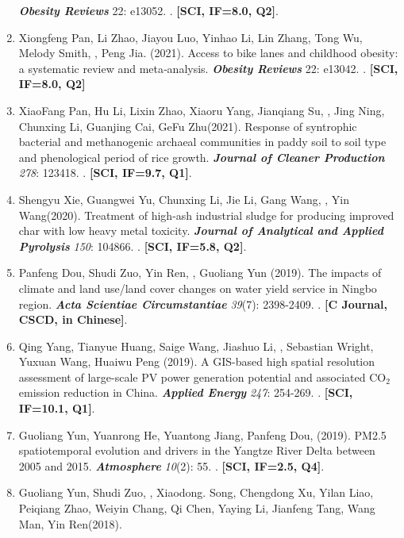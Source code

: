 \begin{enumerate}
    \textbf{\textit{Obesity Reviews}} 22: e13052.
    . \textbf{[SCI, IF=8.0, Q2]}.
\item
    Xiongfeng Pan, Li Zhao, Jiayou Luo, Yinhao Li, Lin Zhang, Tong Wu, Melody Smith, \Shaoqing, Peng Jia\CS. (2021).
    Access to bike lanes and childhood obesity: a systematic review and meta‐analysis.
    \textbf{\textit{Obesity Reviews}} 22: e13042.
    . \textbf{[SCI, IF=8.0, Q2]}
\item
    XiaoFang Pan, Hu Li, Lixin Zhao, Xiaoru Yang, Jianqiang Su, \Shaoqing, Jing Ning, Chunxing Li, Guanjing Cai, GeFu Zhu\CS (2021).
    Response of syntrophic bacterial and methanogenic archaeal communities in paddy soil to soil type and phenological period of rice growth.
    \textbf{\textit{Journal of Cleaner Production}} \textit{278}: 123418.
    . \textbf{[SCI, IF=9.7, Q1]}.
\item
    Shengyu Xie, Guangwei Yu\CS, Chunxing Li, Jie Li, Gang Wang, \Shaoqing, Yin Wang\CS (2020).
    Treatment of high-ash industrial sludge for producing improved char with low heavy metal toxicity.
    \textbf{\textit{Journal of Analytical and Applied Pyrolysis}} \textit{150}: 104866.
    . \textbf{[SCI, IF=5.8, Q2]}.
\item
    Panfeng Dou, Shudi Zuo\CS, Yin Ren, \Shaoqing, Guoliang Yun (2019).
    The impacts of climate and land use/land cover changes on water yield service in Ningbo region.
    \textbf{\textit{Acta Scientiae Circumstantiae}} \textit{39}(7): 2398-2409.
    . \textbf{[C Journal, CSCD, in Chinese]}.
\item
    Qing Yang\CS, Tianyue Huang, Saige Wang\CS, Jiashuo Li\CS, \Shaoqing, Sebastian Wright, Yuxuan Wang, Huaiwu Peng (2019).
    A GIS-based high spatial resolution assessment of large-scale PV power generation potential and associated CO$_2$ emission reduction in China.
    \textbf{\textit{Applied Energy}} \textit{247}: 254-269.
    . \textbf{[SCI, IF=10.1, Q1]}.
\item
    Guoliang Yun, Yuanrong He\CS, Yuantong Jiang, Panfeng Dou, \Shaoqing \enspace (2019).
    PM2.5 spatiotemporal evolution and drivers in the Yangtze River Delta between 2005 and 2015.
    \textbf{\textit{Atmosphere}} \textit{10}(2): 55.
    . \textbf{[SCI, IF=2.5, Q4]}.
\item
    Guoliang Yun, Shudi Zuo, \Shaoqing, Xiaodong. Song, Chengdong Xu, Yilan Liao, Peiqiang Zhao, Weiyin Chang, Qi Chen, Yaying Li, Jianfeng Tang, Wang Man, Yin Ren\CS (2018).

\end{enumerate}
